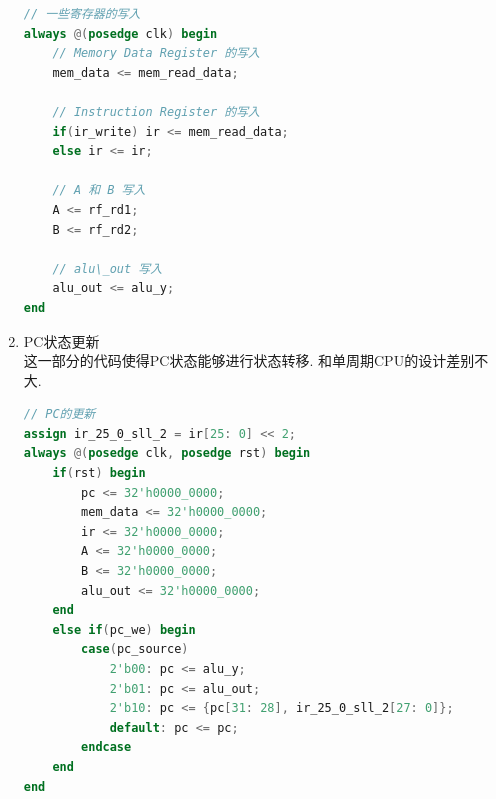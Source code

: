 \documentclass[UTF8]{article}
\begin{document}
\begin{enumerate}
\begin{lstlisting}[language=verilog]
// 一些寄存器的写入
always @(posedge clk) begin
    // Memory Data Register 的写入
    mem_data <= mem_read_data;
    
    // Instruction Register 的写入
    if(ir_write) ir <= mem_read_data;
    else ir <= ir;
    
    // A 和 B 写入
    A <= rf_rd1;
    B <= rf_rd2;
    
    // alu\_out 写入
    alu_out <= alu_y;
end
	\end{lstlisting}
	
	\item PC状态更新\\
	这一部分的代码使得PC状态能够进行状态转移. 和单周期CPU的设计差别不大.
	\begin{lstlisting}[language=verilog]
// PC的更新
assign ir_25_0_sll_2 = ir[25: 0] << 2;
always @(posedge clk, posedge rst) begin
    if(rst) begin
        pc <= 32'h0000_0000;
        mem_data <= 32'h0000_0000;
        ir <= 32'h0000_0000;
        A <= 32'h0000_0000;
        B <= 32'h0000_0000;
        alu_out <= 32'h0000_0000;
    end
    else if(pc_we) begin
        case(pc_source)
            2'b00: pc <= alu_y;
            2'b01: pc <= alu_out;
            2'b10: pc <= {pc[31: 28], ir_25_0_sll_2[27: 0]};
            default: pc <= pc;
        endcase
    end
end
	\end{lstlisting}
	

\end{enumerate}
\end{document}
